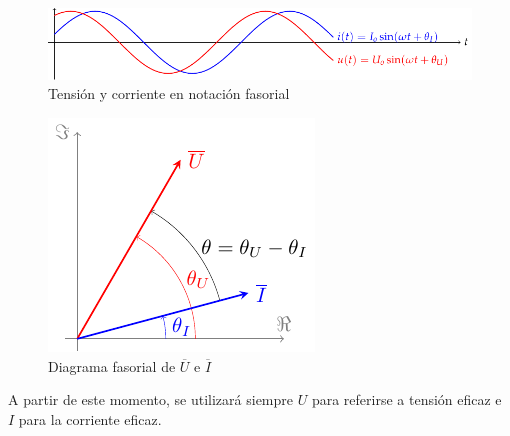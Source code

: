 \documentclass[11pt]{book} %
\numberwithin{dummy}{section}
\theoremstyle{ocrenumbox}
\theoremstyle{blacknumex}
\theoremstyle{blacknumbox}
\theoremstyle{ocrenum}
\newenvironment{remark}{\par\vspace{10pt}\small %
\begin{list}{}{
\leftmargin=35pt %
\rightmargin=25pt}\item\ignorespaces %
\makebox[-2.5pt]{\begin{tikzpicture}[overlay]
\node[draw=ocre!60,line width=1pt,circle,fill=ocre!25,font=\sffamily\bfseries,inner sep=2pt,outer sep=0pt] at (-15pt,0pt){\textcolor{ocre}{N}};\end{tikzpicture}} %
\advance\baselineskip -1pt}{\end{list}\vskip5pt} %
\newlength\esp
\begin{document}
	\begin{figure}[htbp]
		\centering
		\includegraphics[width=.9\linewidth]{../figs/ondasTensionCorriente.pdf}
		\caption{Tensión y corriente en notación fasorial}
		\label{fig.ondasTensionCorriente}
	\end{figure}
	
	
	\begin{figure}[htbp]
		\centering
		\includegraphics[width=0.3\linewidth]{../figs/fasorTensionCorriente.pdf}
		\caption{Diagrama fasorial de $\overline{U}$ e  $\overline{I}$}
		\label{fig.fasortensioncorriente}
	\end{figure}
	
	\begin{remark}
		A partir de este momento, se utilizará siempre $U$ para referirse a tensión eficaz e $I$ para la corriente eficaz.
	\end{remark}
	
\end{document}
